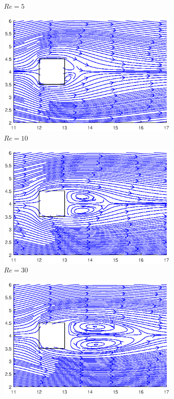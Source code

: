 \begin{figure}[H]
\begin{subfigure}{0.5\textwidth}
		\caption{$Re=5$}
	\end{subfigure}%
	\begin{subfigure}{0.5\textwidth}
		\includegraphics[scale=0.6]{Square/10}
		\caption{$Re=10$}
	\end{subfigure}
	\begin{subfigure}{0.5\textwidth}
		\includegraphics[scale=0.6]{Square/30}
		\caption{$Re=30$}
	\end{subfigure}%
	\begin{subfigure}{0.5\textwidth}
		\includegraphics[scale=0.61]{Square/50}

\end{subfigure}
\end{figure}
